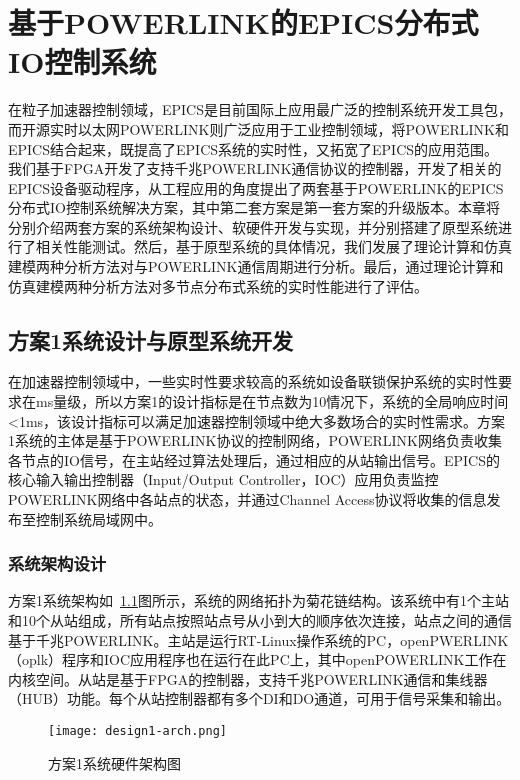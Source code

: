 
\chapter{基于POWERLINK的EPICS分布式IO控制系统}

在粒子加速器控制领域，EPICS是目前国际上应用最广泛的控制系统开发工具包，而开源实时以太网POWERLINK则广泛应用于工业控制领域，将POWERLINK和EPICS结合起来，既提高了EPICS系统的实时性，又拓宽了EPICS的应用范围。我们基于FPGA开发了支持千兆POWERLINK通信协议的控制器，开发了相关的EPICS设备驱动程序，从工程应用的角度提出了两套基于POWERLINK的EPICS分布式IO控制系统解决方案，其中第二套方案是第一套方案的升级版本。本章将分别介绍两套方案的系统架构设计、软硬件开发与实现，并分别搭建了原型系统进行了相关性能测试。然后，基于原型系统的具体情况，我们发展了理论计算和仿真建模两种分析方法对与POWERLINK通信周期进行分析。最后，通过理论计算和仿真建模两种分析方法对多节点分布式系统的实时性能进行了评估。

\section{方案1系统设计与原型系统开发}
在加速器控制领域中，一些实时性要求较高的系统如设备联锁保护系统的实时性要求在ms量级，所以方案1的设计指标是在节点数为10情况下，系统的全局响应时间<1ms，该设计指标可以满足加速器控制领域中绝大多数场合的实时性需求。方案1系统的主体是基于POWERLINK协议的控制网络，POWERLINK网络负责收集各节点的IO信号，在主站经过算法处理后，通过相应的从站输出信号。EPICS的核心输入输出控制器（Input/Output Controller，IOC）应用负责监控POWERLINK网络中各站点的状态，并通过Channel Access协议将收集的信息发布至控制系统局域网中。

\subsection{系统架构设计}
\label{subsection:方案1系统架构设计}
方案1系统架构如~\ref{fig:design1-arch}图所示，系统的网络拓扑为菊花链结构。该系统中有1个主站和10个从站组成，所有站点按照站点号从小到大的顺序依次连接，站点之间的通信基于千兆POWERLINK。主站是运行RT-Linux操作系统的PC，openPWERLINK（oplk）程序和IOC应用程序也在运行在此PC上，其中openPOWERLINK工作在内核空间。从站是基于FPGA的控制器，支持千兆POWERLINK通信和集线器（HUB）功能。每个从站控制器都有多个DI和DO通道，可用于信号采集和输出。

\begin{figure}[!htb]
  \centering
  \texttt{[image: design1-arch.png]}
  \caption{方案1系统硬件架构图}
  \label{fig:design1-arch}
\end{figure}


